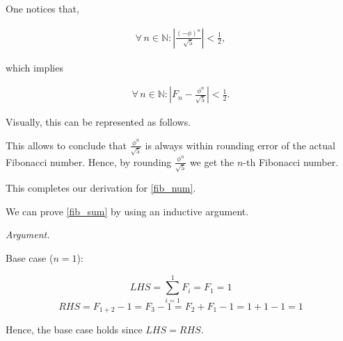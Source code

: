 \documentclass[12pt]{article}
\newcommand{\abs}[1]{\left\lvert #1 \right\rvert}
\begin{document}
One notices that,

\begin{align*}
  \forall \, n \in \mathbb{N} : \abs{\frac{(-\phi)^n}{\sqrt{5}}}
  < \frac{1}{2},
\end{align*}

which implies

\begin{align*}
  \forall \, n \in \mathbb{N} : \abs{F_n -
  \frac{\phi^n}{\sqrt{5}}} < \frac{1}{2}.
\end{align*}

Visually, this can be represented as follows.

\begin{center}
\end{center}

This allows to conclude that $\frac{\phi^n}{\sqrt{5}}$ is always
within rounding error of the actual Fibonacci number. Hence, by
rounding $\frac{\phi^n}{\sqrt{5}}$ we get the $n$-th Fibonacci
number.

This completes our derivation for \ref{fib_num}.

\vspace{1em}

We can prove \ref{fib_sum} by using an inductive argument.

\vspace{1em}

\textit{Argument.}

Base case ($n = 1$): 

$$LHS = \sum_{i = 1}^{1} F_i = F_1 = 1$$ 
$$RHS = F_{1 + 2} - 1 = F_3 - 1 = F_2 + F_1 - 1 = 1 + 1 - 1 =
1$$

Hence, the base case holds since $LHS = RHS$.

\vspace{1em}
\end{document}
